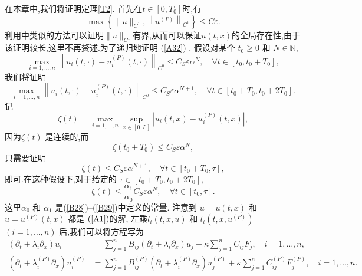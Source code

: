 \documentclass[notitlepage,cs4size,punct,oneside]{ctexrep}
\numberwithin{equation}{chapter}
\theoremstyle{mystyle}
\begin{document}
在本章中,我们将证明定理\ref{T2}. 首先在$t \in [0 , T_0]$时,有
\begin{equation} \label{C1}
    \max \left\{\|u\|_{C^{1}},\left\|u^{(P)}\right\|_{C^{1}}\right\} \leq C \varepsilon.
\end{equation}
利用\cite{26}中类似的方法可以证明$\|u\|_{C^{1}}$有界,从而可以保证$u(t,x)$的全局存在性,由于该证明较长,这里不再赘述.为了递归地证明 (\ref{A32}) , 假设对某个 $t_{0} \geq 0$ 和 $N \in \mathbb{N}$,
\begin{equation} \label{C2}
    \max _{i=1, \ldots, n}\left\|u_{i}(t, \cdot)-u_{i}^{(P)}(t, \cdot)\right\|_{C^{0}} \leq C_{S} \varepsilon \alpha^{N}, \quad \forall t \in\left[t_{0}, t_{0}+T_{0}\right],
\end{equation}
我们将证明
\begin{equation} \label{C3}
    \max _{i=1, \ldots, n}\left\|u_{i}(t, \cdot)-u_{i}^{(P)}(t, \cdot)\right\|_{C^{0}} \leq C_{S} \varepsilon \alpha^{N+1}, \quad \forall t \in\left[t_{0}+T_{0}, t_{0}+2 T_{0}\right] .
\end{equation}
记
\begin{equation} \label{C4}
    \zeta(t)=\max _{i=1, \ldots, n} \sup _{x \in[0, L]}\left|u_{i}(t, x)-u_{i}^{(P)}(t, x)\right|,
\end{equation}
因为$\zeta(t)$ 是连续的,而
\begin{equation} \label{C5}
    \zeta\left(t_{0}+T_{0}\right) \leq C_{S} \varepsilon \alpha^{N},
\end{equation}
只需要证明
\begin{equation} \label{C6}
    \zeta(t) \leq C_{S} \varepsilon \alpha^{N+1}, \quad \forall t \in\left[t_{0}+T_{0}, \tau\right],
\end{equation}
即可.在这种假设下,对于给定的 $\tau \in\left[t_{0}+T_{0}, t_{0}+2 T_{0}\right]$,
\begin{equation} \label{C7}
    \zeta(t) \leq \frac{\alpha_{1}}{\alpha_{0}} C_{S} \varepsilon \alpha^{N}, \quad \forall t \in\left[t_{0}, \tau\right].
\end{equation}
这里$\alpha_{0}$ 和 $\alpha_{1}$ 是(\ref{B28})--(\ref{B29})中定义的常量.
注意到 $u=u(t, x)$ 和 $u=u^{(P)}(t, x)$ 都是 $(\ref{A1})$的解, 左乘$l_{i}(t,x,u)$ 和 $l_{i}\left(t,x,u^{(P)}\right)$ $(i=1, \ldots, n)$ 后,我们可以将方程写为
\begin{align}
    (\partial_{t}+\lambda_i\partial_x)u_i
     & = \sum_{j=1}^{n}B_{ij}(\partial_{t}+\lambda_i\partial_x)u_j + \kappa \sum_{j=1}^{n}C_{ij}F_j,\quad i=1, \ldots, n,  \label{C8}                                \\
    (\partial_{t}+\lambda_i^{(P)}\partial_x)u_i^{(P)}
     & = \sum_{j=1}^{n}B_{ij}^{(P)}(\partial_{t}+\lambda_i^{(P)}\partial_x)u_j^{(P)} + \kappa \sum_{j=1}^{n}C_{ij}^{(P)}F_j^{(P)}, \quad i=1, \ldots, n.  \label{C9}
\end{align}
\end{document}
